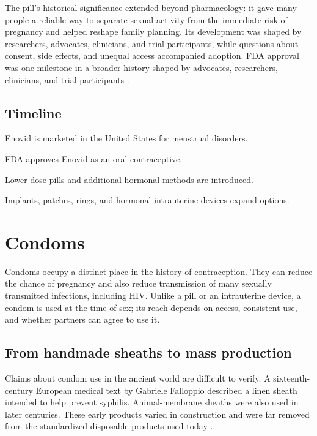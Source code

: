 \documentclass[12pt,oneside]{book}
\begin{document}
The pill’s historical significance extended beyond pharmacology: it gave many
people a reliable way to separate sexual activity from the immediate risk of
pregnancy and helped reshape family planning. Its development was shaped by
researchers, advocates, clinicians, and trial participants, while questions
about consent, side effects, and unequal access accompanied adoption. FDA
approval was one milestone in a broader history shaped by advocates,
researchers, clinicians, and trial participants \cite{fdaEnovidHistory}.

\section*{Timeline}
\begin{description}[leftmargin=2.3cm,style=nextline]
  \item[1957] Enovid is marketed in the United States for menstrual disorders.
  \item[1960] FDA approves Enovid as an oral contraceptive.
  \item[1960s--1970s] Lower-dose pills and additional hormonal methods are introduced.
  \item[Late twentieth century] Implants, patches, rings, and hormonal intrauterine devices expand options.
\end{description}
\chapter[Condoms]{Condoms}

Condoms occupy a distinct place in the history of contraception. They can
reduce the chance of pregnancy and also reduce transmission of many sexually
transmitted infections, including HIV. Unlike a pill or an intrauterine
device, a condom is used at the time of sex; its reach depends on access,
consistent use, and whether partners can agree to use it.

\section{From handmade sheaths to mass production}
Claims about condom use in the ancient world are difficult to verify. A
sixteenth-century European medical text by Gabriele Falloppio described a
linen sheath intended to help prevent syphilis. Animal-membrane sheaths were
also used in later centuries. These early products varied in construction and
were far removed from the standardized disposable products used today
\cite{condomHistory}.
\end{document}
